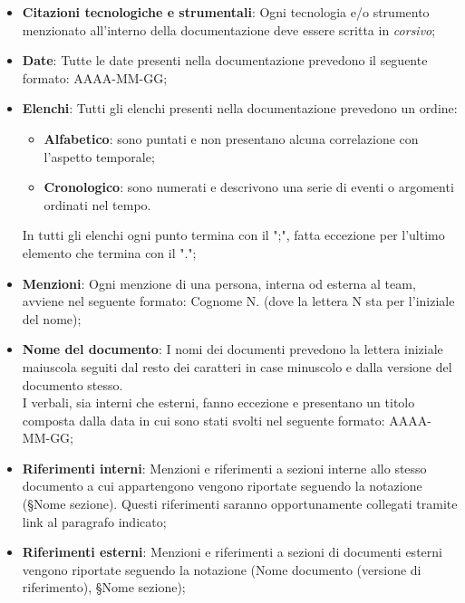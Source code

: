 \documentclass[10pt, a4paper]{article}
\begin{document}
    \begin{itemize}

        \item {\textbf{Citazioni tecnologiche e strumentali}}: Ogni tecnologia e/o strumento menzionato all'interno della documentazione 
        deve essere scritta in \textit{corsivo};
        
        \item {\textbf{Date}}: Tutte le date presenti nella documentazione prevedono il seguente formato: AAAA-MM-GG;
        
        \item {\textbf{Elenchi}}: Tutti gli elenchi presenti nella documentazione prevedono un ordine:
            \begin{itemize}
                \item \textbf{Alfabetico}: sono puntati e non presentano alcuna correlazione con l'aspetto temporale;
                \item \textbf{Cronologico}: sono  numerati e descrivono una serie di eventi o argomenti ordinati nel tempo.
            \end{itemize}
        In tutti gli elenchi ogni punto termina con il ";", fatta eccezione per l'ultimo elemento che termina con il ".";
        
        \item {\textbf{Menzioni}}: Ogni menzione di una persona, interna od esterna al team, avviene nel seguente formato: Cognome N. 
        (dove la lettera N sta per l'iniziale del nome);
        

        \item {\textbf{Nome del documento}}: I nomi dei documenti prevedono la lettera iniziale maiuscola seguiti dal resto dei caratteri 
        in case minuscolo e dalla versione del documento stesso.\\
        I verbali, sia interni che esterni, fanno eccezione e presentano un titolo composta dalla data in cui sono stati svolti nel 
        seguente formato: AAAA-MM-GG;

        \item {\textbf{Riferimenti interni}}: Menzioni e riferimenti a sezioni interne allo stesso documento a cui appartengono vengono 
        riportate seguendo la notazione (\S Nome sezione). Questi riferimenti saranno opportunamente collegati tramite link al paragrafo 
        indicato;
        
        \item {\textbf{Riferimenti esterni}}: Menzioni e riferimenti a sezioni di documenti esterni vengono riportate seguendo la notazione 
        (Nome documento (versione di riferimento), \S Nome sezione);


\end{itemize}
\end{document}
